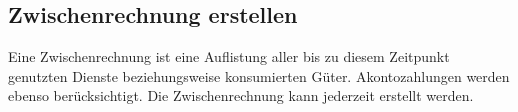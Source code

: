 \documentclass[../SubfileFeatures.tex]{subfiles}
\begin{document}
    \subsection{Zwischenrechnung erstellen}
    Eine Zwischenrechnung ist eine Auflistung aller bis zu diesem Zeitpunkt genutzten Dienste beziehungsweise konsumierten Güter.
	Akontozahlungen werden ebenso berücksichtigt. Die Zwischenrechnung kann jederzeit erstellt werden.
\end{document}
